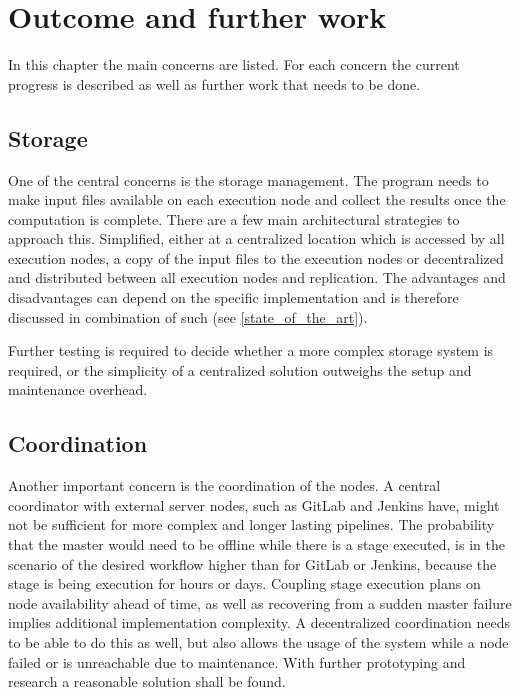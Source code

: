 \chapter{Outcome and further work}

In this chapter the main concerns are listed.
For each concern the current progress is described as well as further work that needs to be done.



\section{Storage}

One of the central concerns is the storage management.
The program needs to make input files available on each execution node and collect the results once the computation is complete.
There are a few main architectural strategies to approach this.
Simplified, either at a centralized location which is accessed by all execution nodes, a copy of the input files to the execution nodes or decentralized and distributed between all execution nodes and replication.
The advantages and disadvantages can depend on the specific implementation and is therefore discussed in combination of such (see \autoref{state_of_the_art}).

Further testing is required to decide whether a more complex storage system is required, or the simplicity of a centralized solution outweighs the setup and maintenance overhead.


%

\section{Coordination}

Another important concern is the coordination of the nodes.
A central coordinator with external server nodes, such as GitLab and Jenkins have, might not be sufficient for more complex and longer lasting pipelines.
The probability that the master would need to be offline while there is a stage executed, is in the scenario of the desired workflow higher than for GitLab or Jenkins, because the stage is being execution for hours or days.
Coupling stage execution plans on node availability ahead of time, as well as recovering from a sudden master failure implies additional implementation complexity.
A decentralized coordination needs to be able to do this as well, but also allows the usage of the system while a node failed or is unreachable due to maintenance.
With further prototyping and research a reasonable solution shall be found.

